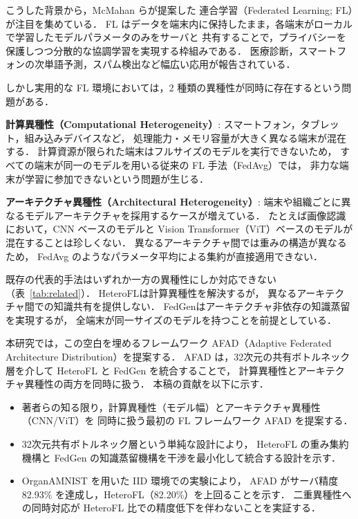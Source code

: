 \documentclass[Japanese,noauthor]{dicomopapers}
\begin{document}
こうした背景から，McMahan ら\cite{McMahanFedAvg}が提案した
連合学習（Federated Learning; FL）が注目を集めている．
FL はデータを端末内に保持したまま，各端末がローカルで学習したモデルパラメータのみをサーバと
共有することで，プライバシーを保護しつつ分散的な協調学習を実現する枠組みである．
医療診断，スマートフォンの次単語予測，スパム検出など幅広い応用が報告されている．

しかし実用的な FL 環境においては，2 種類の異種性が同時に存在するという問題がある．

\textbf{計算異種性（Computational Heterogeneity）}:
スマートフォン，タブレット，組み込みデバイスなど，
処理能力・メモリ容量が大きく異なる端末が混在する．
計算資源が限られた端末はフルサイズのモデルを実行できないため，
すべての端末が同一のモデルを用いる従来の FL 手法（FedAvg\cite{McMahanFedAvg}）では，
非力な端末が学習に参加できないという問題が生じる．

\textbf{アーキテクチャ異種性（Architectural Heterogeneity）}:
端末や組織ごとに異なるモデルアーキテクチャを採用するケースが増えている．
たとえば画像認識において，CNN ベースのモデルと
Vision Transformer（ViT）\cite{VisionTransformer}ベースのモデルが混在することは珍しくない．
異なるアーキテクチャ間では重みの構造が異なるため，
FedAvg のようなパラメータ平均による集約が直接適用できない．

既存の代表的手法はいずれか一方の異種性にしか対応できない（表~\ref{tab:related}）．
HeteroFL\cite{HeteroFL}は計算異種性を解決するが，
異なるアーキテクチャ間での知識共有を提供しない．
FedGen\cite{FedGen}はアーキテクチャ非依存の知識蒸留を実現するが，
全端末が同一サイズのモデルを持つことを前提としている．

本研究では，この空白を埋めるフレームワーク
AFAD（Adaptive Federated Architecture Distribution）を提案する．
AFAD は，32次元の共有ボトルネック層を介して HeteroFL と FedGen を統合することで，
計算異種性とアーキテクチャ異種性の両方を同時に扱う．
本稿の貢献を以下に示す．

\begin{itemize}
  \item 著者らの知る限り，計算異種性（モデル幅）とアーキテクチャ異種性（CNN/ViT）を
        同時に扱う最初の FL フレームワーク AFAD を提案する．
  \item 32次元共有ボトルネック層という単純な設計により，
        HeteroFL の重み集約機構と FedGen の知識蒸留機構を干渉を最小化して統合する設計を示す．
  \item OrganAMNIST を用いた IID 環境での実験により，
        AFAD がサーバ精度 82.93\% を達成し，HeteroFL（82.20\%）を上回ることを示す．
        二重異種性への同時対応が HeteroFL 比での精度低下を伴わないことを実証する．
\end{itemize}
\end{document}
